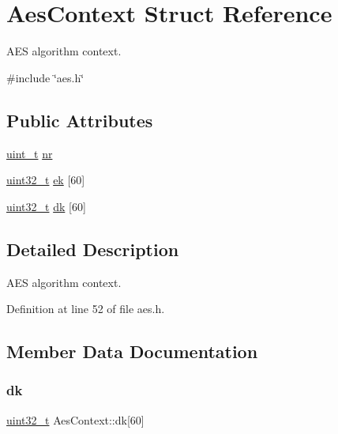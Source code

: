 \hypertarget{structAesContext}{}\section{Aes\+Context Struct Reference}
\label{structAesContext}


A\+ES algorithm context.  




{\ttfamily \#include \char`\"{}aes.\+h\char`\"{}}

\subsection*{Public Attributes}
\begin{DoxyCompactItemize}
\item 
\hyperlink{compiler__port_8h_a12a1e9b3ce141648783a82445d02b58d}{uint\+\_\+t} \hyperlink{structAesContext_aabd0cf2167c7b59f419dda6d0ed9c9ad}{nr}
\item 
\hyperlink{stdint_8h_a435d1572bf3f880d55459d9805097f62}{uint32\+\_\+t} \hyperlink{structAesContext_ad8944ec0ee52c01192e26e18120dfab4}{ek} \mbox{[}60\mbox{]}
\item 
\hyperlink{stdint_8h_a435d1572bf3f880d55459d9805097f62}{uint32\+\_\+t} \hyperlink{structAesContext_a39944caefcfd380dd50aa6a089c981e6}{dk} \mbox{[}60\mbox{]}
\end{DoxyCompactItemize}


\subsection{Detailed Description}
A\+ES algorithm context. 

Definition at line 52 of file aes.\+h.



\subsection{Member Data Documentation}
\mbox{\label{structAesContext_a39944caefcfd380dd50aa6a089c981e6}} 
\subsubsection{\texorpdfstring{dk}{dk}}
{\footnotesize\ttfamily \hyperlink{stdint_8h_a435d1572bf3f880d55459d9805097f62}{uint32\+\_\+t} Aes\+Context\+::dk\mbox{[}60\mbox{]}}




